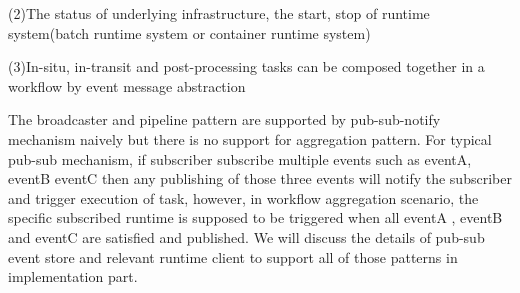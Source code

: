 (2)The status of underlying infrastructure, the start, stop of runtime system(batch runtime system or container runtime system)

(3)In-situ, in-transit and post-processing tasks can be composed together in a workflow by event message abstraction

The broadcaster and pipeline pattern are supported by pub-sub-notify mechanism naively but there is no support for aggregation pattern. For typical pub-sub mechanism, if subscriber subscribe multiple events such as eventA, eventB eventC then any publishing of those three events will notify the subscriber and trigger execution of task, however, in workflow aggregation scenario, the specific subscribed runtime is supposed to be triggered when all eventA , eventB and eventC are satisfied and published. We will discuss the details of pub-sub event store and relevant runtime client to support all of those patterns in implementation part. 

